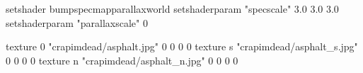 setshader bumpspecmapparallaxworld
setshaderparam "specscale" 3.0 3.0 3.0
setshaderparam "parallaxscale" 0

texture 0 "crapimdead/asphalt.jpg" 0 0 0 0
texture s "crapimdead/asphalt_s.jpg" 0 0 0 0
texture n "crapimdead/asphalt_n.jpg" 0 0 0 0
